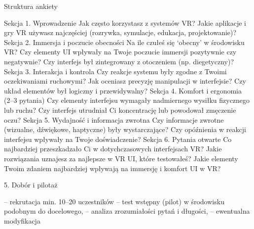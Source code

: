 
Struktura ankiety 


Sekcja 1. Wprowadzenie 
Jak często korzystasz z systemów VR?
Jakie aplikacje i gry VR używasz najczęściej (rozrywka, symulacje, edukacja, projektowanie)?
Sekcja 2. Immersja i poczucie obecności 
Na ile czułeś się ‘obecny’ w środowisku VR?
Czy elementy UI wpływały na Twoje poczucie immersji pozytywnie czy negatywnie?
Czy interfejs był zintegrowany z otoczeniem (np. diegetyczny)?
Sekcja 3. Interakcja i kontrola 
Czy reakcje systemu były zgodne z Twoimi oczekiwaniami ruchowymi?
Jak oceniasz precyzję manipulacji w interfejsie?
Czy układ elementów był logiczny i przewidywalny?
Sekcja 4. Komfort i ergonomia (2–3 pytania)
Czy elementy interfejsu wymagały nadmiernego wysiłku fizycznego lub ruchu?
Czy interfejs utrudniał Ci koncentrację lub powodował zmęczenie oczu?
Sekcja 5. Wydajność i informacja zwrotna
Czy informacje zwrotne (wizualne, dźwiękowe, haptyczne) były wystarczające?
Czy opóźnienia w reakcji interfejsu wpływały na Twoje doświadczenie?
Sekcja 6. Pytania otwarte 
Co najbardziej przeszkadzało Ci w dotychczasowych interfejsach VR?
Jakie rozwiązania uznajesz za najlepsze w VR UI, które testowałeś?
Jakie elementy Twoim zdaniem najbardziej wpływają na immersję i komfort UI w VR?

5. Dobór i pilotaż

– rekrutacja min. 10–20 uczestników
– test wstępny (pilot) w środowisku podobnym do docelowego,
– analiza zrozumiałości pytań i długości, 
– ewentualna modyfikacja

